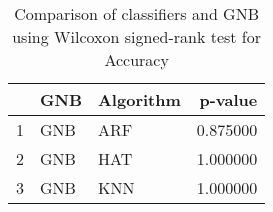 \begin{table}
\footnotesize
\caption{Comparison of classifiers and GNB using Wilcoxon signed-rank test for Accuracy}
\label{tab:GNB wilcoxon Accuracy comparison}
\begin{tabular}{lllr}
\hline
 & GNB & Algorithm & p-value \\
\hline
1 & GNB & ARF & 0.875000 \\
2 & GNB & HAT & 1.000000 \\
3 & GNB & KNN & 1.000000 \\
\hline
\end{tabular}
\end{table}
